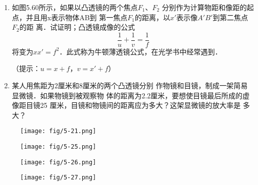 \begin{enumerate}
\begin{solution}
\end{solution}
\item 如图5.60所示，如果以凸透镜的两个焦点$F_1$、$F_2$
分别作为计算物距和像距的起点，并且用x表示物体AB到
第一焦点$F_1$的距离，以$x'$表示像$A'B'$到第二焦点$F_2$的距
离．试证明；凸透镜成像的公式
\[\frac{1}{u}+\frac{1}{v}=\frac{1}{f} \]
将变为$xx'=f^2$．此式称为牛顿薄透镜公式，在光学书中经常遇到．
\begin{figure}[htp]
	\centering
{}
	\caption{}
\end{figure}
（提示：$u=x+f$，$v=x'+f$）
\item 某人用焦距为2厘米和8厘米的两个凸透镜分别
作物镜和目镜，制成一架简易显微镜．如果物镜到被观察物
体的距离为2.2厘米，要想使目镜最后所成的虚像距目镜25
厘米，目镜和物镜间的距离应为多大？这架显微镜的放大率是
多大？

\begin{solution}

\end{solution}
\end{enumerate}



\begin{figure}[htp]
    \centering
    \texttt{[image: fig/5-21.png]}
    \caption{}
\end{figure}





\begin{figure}[htp]
    \centering
    \texttt{[image: fig/5-25.png]}
    \caption{}
\end{figure}




\begin{figure}[htp]
    \centering
    \texttt{[image: fig/5-26.png]}
    \caption{}
\end{figure}






\begin{figure}[htp]
    \centering
    \texttt{[image: fig/5-27.png]}
    \caption{}
\end{figure}

















